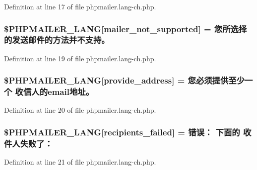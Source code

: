 Definition at line 17 of file phpmailer.\+lang-\/ch.\+php.

\subsubsection[{\texorpdfstring{\$\+P\+H\+P\+M\+A\+I\+L\+E\+R\+\_\+\+L\+A\+NG}{$PHPMAILER_LANG}}]{\setlength{\rightskip}{0pt plus 5cm}\$P\+H\+P\+M\+A\+I\+L\+E\+R\+\_\+\+L\+A\+NG\mbox{[}\textquotesingle{}mailer\+\_\+not\+\_\+supported\textquotesingle{}\mbox{]} = \textquotesingle{} 您所选择的发送邮件的方法并不支持。\textquotesingle{}}\hypertarget{phpmailer_8lang-ch_8php_aa2ebcb8833ee83a7ad67401c4bb3a6ad}{}\label{phpmailer_8lang-ch_8php_aa2ebcb8833ee83a7ad67401c4bb3a6ad}


Definition at line 19 of file phpmailer.\+lang-\/ch.\+php.

\subsubsection[{\texorpdfstring{\$\+P\+H\+P\+M\+A\+I\+L\+E\+R\+\_\+\+L\+A\+NG}{$PHPMAILER_LANG}}]{\setlength{\rightskip}{0pt plus 5cm}\$P\+H\+P\+M\+A\+I\+L\+E\+R\+\_\+\+L\+A\+NG\mbox{[}\textquotesingle{}provide\+\_\+address\textquotesingle{}\mbox{]} = \textquotesingle{}您必须提供至少一个 收信人的email地址。\textquotesingle{}}\hypertarget{phpmailer_8lang-ch_8php_a8b97897c2406b7392b056f375feeefbb}{}\label{phpmailer_8lang-ch_8php_a8b97897c2406b7392b056f375feeefbb}


Definition at line 20 of file phpmailer.\+lang-\/ch.\+php.

\subsubsection[{\texorpdfstring{\$\+P\+H\+P\+M\+A\+I\+L\+E\+R\+\_\+\+L\+A\+NG}{$PHPMAILER_LANG}}]{\setlength{\rightskip}{0pt plus 5cm}\$P\+H\+P\+M\+A\+I\+L\+E\+R\+\_\+\+L\+A\+NG\mbox{[}\textquotesingle{}recipients\+\_\+failed\textquotesingle{}\mbox{]} =  错误： 下面的 收件人失败了： \textquotesingle{}}\hypertarget{phpmailer_8lang-ch_8php_a7589d30bb9b368327c2df015f3e6bcba}{}\label{phpmailer_8lang-ch_8php_a7589d30bb9b368327c2df015f3e6bcba}


Definition at line 21 of file phpmailer.\+lang-\/ch.\+php.

